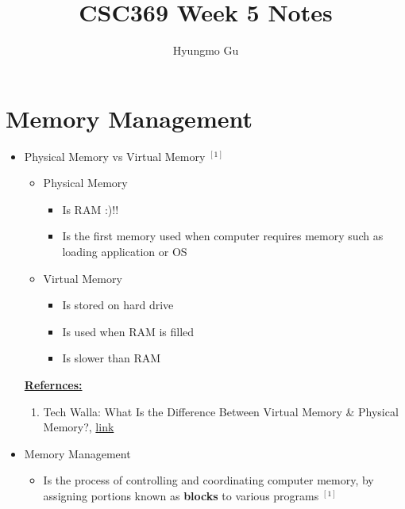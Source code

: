 \documentclass[12pt]{article}
\begin{document}
\title{CSC369 Week 5 Notes}
\author{Hyungmo Gu}
\maketitle

\bigskip

\section{Memory Management}

\begin{itemize}
    \item Physical Memory vs Virtual Memory $^{[1]}$
    \begin{itemize}
        \item Physical Memory
        \begin{itemize}
            \item Is RAM :)!!
            \item Is the first memory used when computer requires memory such as
            loading application or OS
        \end{itemize}
        \item Virtual Memory
        \begin{itemize}
            \item Is stored on hard drive
            \item Is used when RAM is filled
            \item Is slower than RAM
        \end{itemize}
    \end{itemize}

    \bigskip

    \underline{\textbf{Refernces:}}

    \bigskip

    \begin{enumerate}[1)]
        \item Tech Walla: What Is the Difference Between Virtual Memory \& Physical Memory?, \href{https://www.techwalla.com/articles/difference-virtual-memory-physical-memory_}{link}
    \end{enumerate}

    \item Memory Management
    \begin{itemize}
        \item Is the process of controlling and coordinating computer memory,
        by assigning portions known as \textbf{blocks} to various programs $^{[1]}$
    \end{itemize}


\end{itemize}
\end{document}
